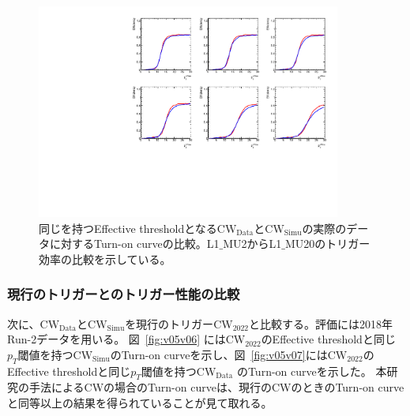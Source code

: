 \begin{figure}[h]
  \centering
  \includegraphics[clip, width=10cm]{fig/5/v06v07_10_15.pdf}
  \caption{同じを持つEffective thresholdとなる$\mathrm{CW_{Data}}$と$\mathrm{CW_{Simu}}$の実際のデータに対するTurn-on curveの比較。L1$\_$MU2からL1$\_$MU20のトリガー効率の比較を示している。}
  \label{fig:v06v07_12_20}
\end{figure}

\subsubsection{現行のトリガーとのトリガー性能の比較}
次に、$\mathrm{CW_{Data}}$と$\mathrm{CW_{Simu}}$を現行のトリガー$\mathrm{CW_{2022}}$と比較する。評価には2018年Run-2データを用いる。
図~\ref{fig:v05v06} には$\mathrm{CW_{2022}}$のEffective thresholdと同じ$p_T$閾値を持つ$\mathrm{CW_{Simu}}$のTurn-on curveを示し、図~\ref{fig:v05v07}には$\mathrm{CW_{2022}}$のEffective thresholdと同じ$p_T$閾値を持つ$\mathrm{CW_{Data}}$ のTurn-on curveを示した。
本研究の手法によるCWの場合のTurn-on curveは、現行のCWのときのTurn-on curveと同等以上の結果を得られていることが見て取れる。

